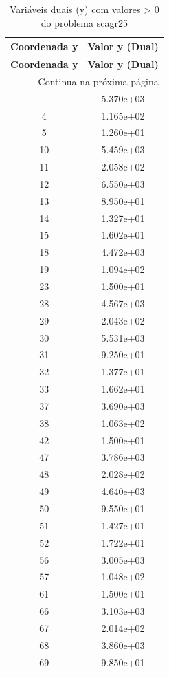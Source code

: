 \documentclass[12pt]{article}
\begin{document}
\begin{longtable}{@{}cc@{}}
\caption{Variáveis duais (y) com valores > 0 do problema scagr25} \\
\toprule
\textbf{Coordenada y} & \textbf{Valor y (Dual)} \\
\midrule
\endfirsthead

\toprule
\textbf{Coordenada y} & \textbf{Valor y (Dual)} \\
\midrule
\endhead

\midrule \multicolumn{2}{r}{{Continua na próxima página}} \\ \midrule
\endfoot

\bottomrule
\endlastfoot
3 & 5.370e+03 \\
4 & 1.165e+02 \\
5 & 1.260e+01 \\
10 & 5.459e+03 \\
11 & 2.058e+02 \\
12 & 6.550e+03 \\
13 & 8.950e+01 \\
14 & 1.327e+01 \\
15 & 1.602e+01 \\
18 & 4.472e+03 \\
19 & 1.094e+02 \\
23 & 1.500e+01 \\
28 & 4.567e+03 \\
29 & 2.043e+02 \\
30 & 5.531e+03 \\
31 & 9.250e+01 \\
32 & 1.377e+01 \\
33 & 1.662e+01 \\
37 & 3.690e+03 \\
38 & 1.063e+02 \\
42 & 1.500e+01 \\
47 & 3.786e+03 \\
48 & 2.028e+02 \\
49 & 4.640e+03 \\
50 & 9.550e+01 \\
51 & 1.427e+01 \\
52 & 1.722e+01 \\
56 & 3.005e+03 \\
57 & 1.048e+02 \\
61 & 1.500e+01 \\
66 & 3.103e+03 \\
67 & 2.014e+02 \\
68 & 3.860e+03 \\
69 & 9.850e+01 \\

\end{longtable}
\end{document}

